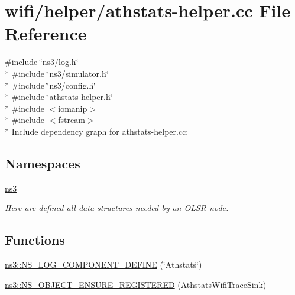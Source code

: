 \hypertarget{athstats-helper_8cc}{}\section{wifi/helper/athstats-\/helper.cc File Reference}
\label{athstats-helper_8cc}
{\ttfamily \#include \char`\"{}ns3/log.\+h\char`\"{}}\\*
{\ttfamily \#include \char`\"{}ns3/simulator.\+h\char`\"{}}\\*
{\ttfamily \#include \char`\"{}ns3/config.\+h\char`\"{}}\\*
{\ttfamily \#include \char`\"{}athstats-\/helper.\+h\char`\"{}}\\*
{\ttfamily \#include $<$iomanip$>$}\\*
{\ttfamily \#include $<$fstream$>$}\\*
Include dependency graph for athstats-\/helper.cc\+:
\subsection*{Namespaces}
\begin{DoxyCompactItemize}
\item 
 \hyperlink{namespacens3}{ns3}
\begin{DoxyCompactList}\small\item\em Here are defined all data structures needed by an O\+L\+SR node. \end{DoxyCompactList}\end{DoxyCompactItemize}
\subsection*{Functions}
\begin{DoxyCompactItemize}
\item 
\hyperlink{namespacens3_a0c6a5531cfe8ae03bee89cb2afda0fe8}{ns3\+::\+N\+S\+\_\+\+L\+O\+G\+\_\+\+C\+O\+M\+P\+O\+N\+E\+N\+T\+\_\+\+D\+E\+F\+I\+NE} (\char`\"{}Athstats\char`\"{})
\item 
\hyperlink{namespacens3_ac6d20381617e82ea4975da41a3404736}{ns3\+::\+N\+S\+\_\+\+O\+B\+J\+E\+C\+T\+\_\+\+E\+N\+S\+U\+R\+E\+\_\+\+R\+E\+G\+I\+S\+T\+E\+R\+ED} (Athstats\+Wifi\+Trace\+Sink)
\end{DoxyCompactItemize}
